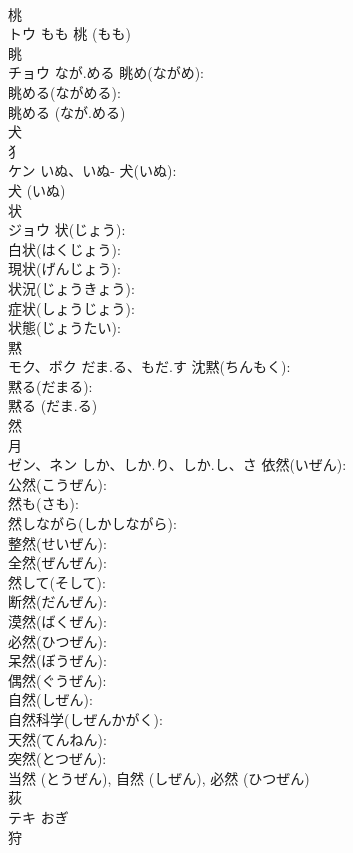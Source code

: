 \documentclass[8pt]{extreport}
\begin{document}
\begin{CJK}{UTF8}{min}
\\	桃			
\\	トウ	もも		桃 (もも)
\\	眺			
\\	チョウ	なが.める	眺め(ながめ): 
\\	眺める(ながめる): 
\\	眺める (なが.める)
\\	犬			
\\	犭 
\\	ケン	いぬ、いぬ-	犬(いぬ): 
\\	犬 (いぬ)
\\	状			
\\	ジョウ		状(じょう): 
\\	白状(はくじょう): 
\\	現状(げんじょう): 
\\	状況(じょうきょう): 
\\	症状(しょうじょう): 
\\	状態(じょうたい): 
\\	黙			
\\	モク、ボク	だま.る、もだ.す	沈黙(ちんもく): 
\\	黙る(だまる): 
\\	黙る (だま.る)
\\	然			
\\	月 
\\	ゼン、ネン	しか、しか.り、しか.し、さ	依然(いぜん): 
\\	公然(こうぜん): 
\\	然も(さも): 
\\	然しながら(しかしながら): 
\\	整然(せいぜん): 
\\	全然(ぜんぜん): 
\\	然して(そして): 
\\	断然(だんぜん): 
\\	漠然(ばくぜん): 
\\	必然(ひつぜん): 
\\	呆然(ぼうぜん): 
\\	偶然(ぐうぜん): 
\\	自然(しぜん): 
\\	自然科学(しぜんかがく): 
\\	天然(てんねん): 
\\	突然(とつぜん): 
\\	当然 (とうぜん), 自然 (しぜん), 必然 (ひつぜん)
\\	荻			
\\	テキ	おぎ		
\\	狩			

\end{CJK}
\end{document}
